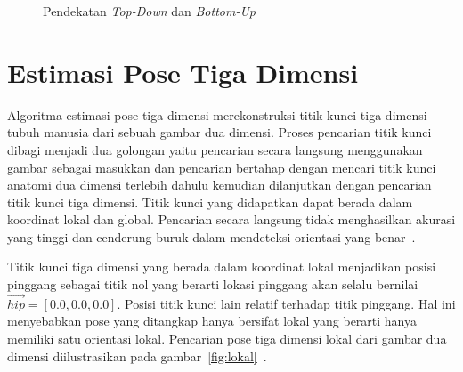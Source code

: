 \begin{figure}[htbp]
    \begin{center}
    \end{center}
    \vspace{-20pt}
    \captionsetup{labelfont=bf, textfont=bf}
    \caption{Pendekatan \textit{Top-Down} dan \textit{Bottom-Up}}
    \vspace{-10pt}
    \captionsetup{labelfont=md, textfont=md}
    \label{fig:tdbu}
\end{figure}

\section{Estimasi Pose Tiga Dimensi}
\label{sec:2-EstimasiPoseTigaDimensi}

Algoritma estimasi pose tiga dimensi merekonstruksi titik kunci tiga dimensi tubuh manusia dari
sebuah gambar dua dimensi. Proses pencarian titik kunci dibagi menjadi dua golongan yaitu pencarian
secara langsung menggunakan gambar sebagai masukkan dan pencarian bertahap dengan mencari titik kunci
anatomi dua dimensi terlebih dahulu kemudian dilanjutkan dengan pencarian titik kunci tiga dimensi.
Titik kunci yang didapatkan dapat berada dalam koordinat lokal dan global.
Pencarian secara langsung tidak menghasilkan akurasi yang tinggi dan cenderung buruk dalam mendeteksi
orientasi yang benar~\cite{2020arXiv200210322C}.

Titik kunci tiga dimensi yang berada dalam koordinat lokal menjadikan posisi pinggang sebagai titik
nol yang berarti lokasi pinggang akan selalu bernilai $\vec{hip} = [0.0, 0.0, 0.0]$. Posisi titik
kunci lain relatif terhadap titik pinggang. Hal ini menyebabkan pose yang ditangkap hanya bersifat
lokal yang berarti hanya memiliki satu orientasi lokal. Pencarian pose tiga dimensi lokal dari gambar
dua dimensi diilustrasikan pada gambar~\ref{fig:lokal}~\cite{martinez_2017_3dbaseline}.

